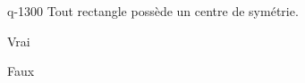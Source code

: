 \begin{truefalse}{q-1300}
Tout rectangle possède un centre de symétrie.
\item* Vrai
\item Faux
\end{truefalse}

